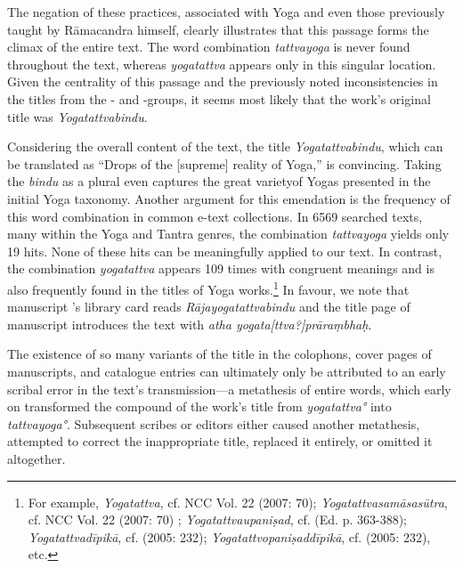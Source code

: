 The negation of these practices, associated with Yoga and even those previously taught by Rāmacandra himself, clearly illustrates that this passage forms the climax of the entire text. The word combination \textit{tattvayoga} is never found throughout the text, whereas \textit{yogatattva} appears only in this singular location. Given the centrality of this passage and the previously noted inconsistencies in the titles from the \alpha- and \beta-groups, it seems most likely that the work's original title was \emph{Yogatattvabindu}.

Considering the overall content of the text, the title \textit{Yogatattvabindu}, which can be translated as ``Drops of the [supreme] reality of Yoga,'' is convincing. Taking the \textit{bindu} as a plural even captures the great varietyof Yogas presented in the initial Yoga taxonomy. Another argument for this emendation is the frequency of this word combination in common e-text collections. In 6569 searched texts, many within the Yoga and Tantra genres, the combination \textit{tattvayoga} yields only 19 hits. None of these hits can be meaningfully applied to our text. In contrast, the combination \textit{yogatattva} appears 109 times with congruent meanings and is also frequently found in the titles of Yoga works.\footnote{For example, \emph{Yogatattva}, cf. NCC Vol. 22 (2007: 70); \emph{Yogatattvasamāsasūtra}, cf. NCC Vol. 22 (2007: 70) \nocite{newcataloguscatalogorum22}; \emph{Yogatattvaupaniṣad}, cf.  (Ed. p. 363-388); \emph{Yogatattvadīpikā}, cf.  (2005: 232); \emph{Yogatattvopaniṣaddīpikā}, cf.  (2005: 232), etc.} In favour, we note that manuscript 's library card reads \textit{Rājayogatattvabindu} and the title page of manuscript  introduces the text with \textit{atha yogata[ttva?]prāraṃbhaḥ}. 

The existence of so many variants of the title in the colophons, cover pages of manuscripts, and catalogue entries can ultimately only be attributed to an early scribal error in the text's transmission—a metathesis of entire words, which early on transformed the compound of the work's title from \textit{yogatattva°} into \textit{tattvayoga°}. Subsequent scribes or editors either caused another metathesis, attempted to correct the inappropriate title, replaced it entirely, or omitted it altogether.

